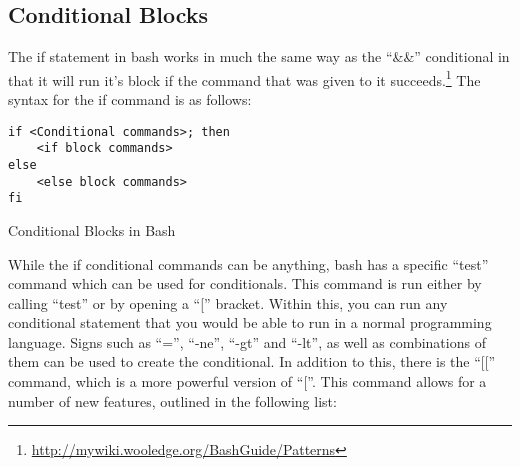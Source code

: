 		\subsection{Conditional Blocks}
			The if statement in bash works in much the same way as the ``\&\&'' conditional in that it will run it's block if the command that was given to it succeeds.\footnote{\url{http://mywiki.wooledge.org/BashGuide/Patterns}}
			The syntax for the if command is as follows:
			\begin{code}
			\begin{verbatim}
if <Conditional commands>; then
	<if block commands>
else
	<else block commands>
fi
			\end{verbatim}
			\label{code:BashConditionalBlocks}
			\caption{Conditional Blocks in Bash}
			\end{code}
			While the if conditional commands can be anything, bash has a specific ``test'' command which can be used for conditionals.
			This command is run either by calling ``test'' or by opening a ``['' bracket.
			Within this, you can run any conditional statement that you would be able to run in a normal programming language.
			Signs such as ``='', ``-ne'', ``-gt'' and ``-lt'', as well as combinations of them can be used to create the conditional.
			In addition to this, there is the ``[['' command, which is a more powerful version of ``[''.
			This command allows for a number of new features, outlined in the following list:
